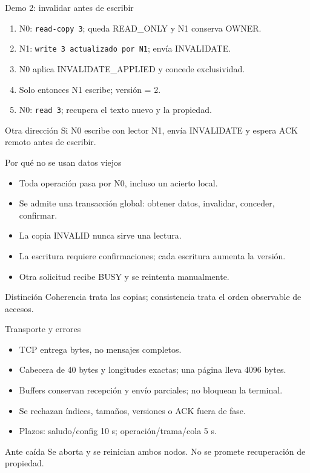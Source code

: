 \documentclass[aspectratio=169]{beamer}
\begin{document}
\begin{frame}{Demo 2: invalidar antes de escribir}
\begin{enumerate}
\item N0: \texttt{read-copy 3}; queda READ\_ONLY y N1 conserva OWNER.
\item N1: \texttt{write 3 actualizado por N1}; envía INVALIDATE.
\item N0 aplica INVALIDATE\_APPLIED y concede exclusividad.
\item Solo entonces N1 escribe; versión = 2.
\item N0: \texttt{read 3}; recupera el texto nuevo y la propiedad.
\end{enumerate}
\begin{block}{Otra dirección}
Si N0 escribe con lector N1, envía INVALIDATE y espera ACK remoto antes de escribir.
\end{block}
\end{frame}

\begin{frame}{Por qué no se usan datos viejos}
\begin{itemize}
\item Toda operación pasa por N0, incluso un acierto local.
\item Se admite una transacción global: obtener datos, invalidar, conceder, confirmar.
\item La copia INVALID nunca sirve una lectura.
\item La escritura requiere confirmaciones; cada escritura aumenta la versión.
\item Otra solicitud recibe BUSY y se reintenta manualmente.
\end{itemize}
\begin{block}{Distinción}
Coherencia trata las copias; consistencia trata el orden observable de accesos.
\end{block}
\end{frame}

\begin{frame}{Transporte y errores}
\begin{itemize}
\item TCP entrega bytes, no mensajes completos.
\item Cabecera de 40 bytes y longitudes exactas; una página lleva 4096 bytes.
\item Buffers conservan recepción y envío parciales; no bloquean la terminal.
\item Se rechazan índices, tamaños, versiones o ACK fuera de fase.
\item Plazos: saludo/config 10 s; operación/trama/cola 5 s.
\end{itemize}
\begin{alertblock}{Ante caída}
Se aborta y se reinician ambos nodos. No se promete recuperación de propiedad.
\end{alertblock}
\end{frame}
\end{document}
